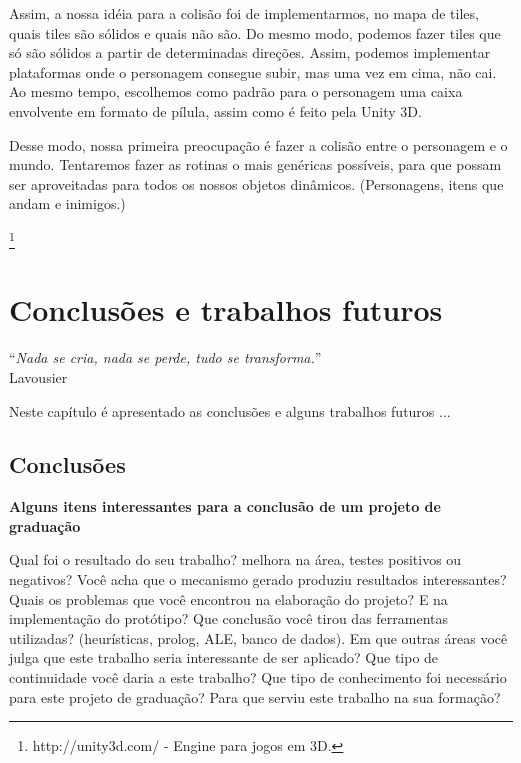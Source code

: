 \documentclass[brazil]{abnt}
\begin{document}
Assim, a nossa idéia para a colisão foi de implementarmos, no mapa de tiles, quais tiles são sólidos e quais não são. Do mesmo modo, podemos fazer tiles que só são sólidos a partir de determinadas direções. Assim, podemos implementar plataformas onde o personagem consegue subir, mas uma vez em cima, não cai. Ao mesmo tempo, escolhemos como padrão para o personagem uma caixa envolvente em formato de pílula, assim como é feito pela Unity 3D.\footnotemark

Desse modo, nossa primeira preocupação é fazer a colisão entre o personagem e o mundo. Tentaremos fazer as rotinas o mais genéricas possíveis, para que possam ser aproveitadas para todos os nossos objetos dinâmicos. (Personagens, itens que andam e inimigos.)

\footnote{http://unity3d.com/ - Engine para jogos em 3D.}

\chapter{Conclusões e trabalhos futuros\label{cap:conclusao}}

\vfill{}
\begin{flushright}{}``\emph{Nada se cria, nada se perde, tudo se
transforma.}''\\
{\small Lavousier}\end{flushright}{\small \par}
\vfill{}

Neste capítulo é apresentado as conclusões e alguns trabalhos futuros
...
\newpage


\section{Conclusões}

{\bf Alguns itens interessantes para a conclusão de um projeto de graduação}

Qual foi o resultado do seu trabalho? melhora na área, testes positivos ou negativos?
Você acha que o mecanismo gerado produziu resultados interessantes?
Quais os problemas que você encontrou na elaboração do projeto?
E na implementação do protótipo?
Que conclusão você tirou das ferramentas utilizadas? (heurísticas, prolog, ALE, banco de dados).
Em que outras áreas você julga que este trabalho seria interessante de ser aplicado?
Que tipo de continuidade você daria a este trabalho?
Que tipo de conhecimento foi necessário para este projeto de graduação?
Para que serviu este trabalho na sua formação?
\end{document}

